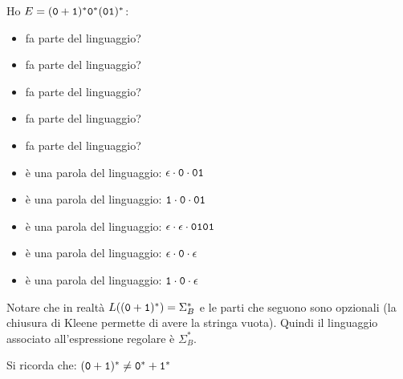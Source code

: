 \begin{Exercise}[label=3-1]
	Ho $E=(\mathtt{0}+\mathtt{1})^*\mathtt{0}^*(\mathtt{0}\mathtt{1})^*$:
	\begin{itemize}
		\item \zero\zero\uno fa parte del linguaggio?
		\item \uno\zero\zero\uno fa parte del linguaggio?
		\item \zero\uno\zero\uno fa parte del linguaggio?
		\item \zero fa parte del linguaggio?
		\item \uno\zero fa parte del linguaggio?
	\end{itemize}
\end{Exercise}


\begin{Answer}
	\begin{itemize}
		\item \zero\zero\uno è una parola del linguaggio: $\epsilon\cdot \mathtt{0}\cdot \mathtt{0}\mathtt{1}$
		\item \uno\zero\zero\uno è una parola del linguaggio: $\mathtt{1}\cdot \mathtt{0}\cdot \mathtt{0}\mathtt{1}$
		\item \zero\uno\zero\uno è una parola del linguaggio: $\epsilon\cdot\epsilon \cdot \mathtt{0}\mathtt{1}\mathtt{0}\mathtt{1}$
		\item \zero è una parola del linguaggio: $\epsilon\cdot \mathtt{0}\cdot \epsilon$
		\item \uno\zero è una parola del linguaggio: $\mathtt{1}\cdot \mathtt{0}\cdot \epsilon$
	\end{itemize}



	Notare che in realtà $L((\mathtt{0}+\mathtt{1})^*)= \Sigma_{B}^*$ e le parti che seguono sono opzionali (la chiusura di Kleene permette di
	avere la stringa vuota).
	Quindi il linguaggio associato all'espressione regolare è $\Sigma_{B}^*$.
\end{Answer}

Si ricorda che:
$(\mathtt{0}+\mathtt{1})^*\neq \mathtt{0}^*+\mathtt{1}^*$

